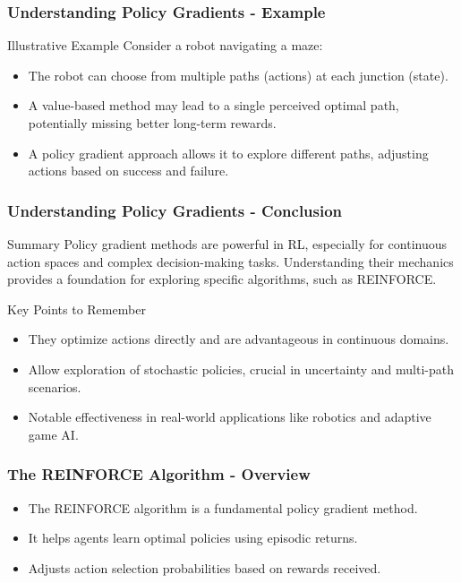 \documentclass{beamer}
\begin{document}
\begin{frame}[fragile]
    \frametitle{Understanding Policy Gradients - Example}
    \begin{block}{Illustrative Example}
        Consider a robot navigating a maze:
        \begin{itemize}
            \item The robot can choose from multiple paths (actions) at each junction (state).
            \item A value-based method may lead to a single perceived optimal path, potentially missing better long-term rewards.
            \item A policy gradient approach allows it to explore different paths, adjusting actions based on success and failure.
        \end{itemize}
    \end{block}
\end{frame}

\begin{frame}[fragile]
    \frametitle{Understanding Policy Gradients - Conclusion}
    \begin{block}{Summary}
        Policy gradient methods are powerful in RL, especially for continuous action spaces and complex decision-making tasks. 
        Understanding their mechanics provides a foundation for exploring specific algorithms, such as REINFORCE.
    \end{block}
    \begin{block}{Key Points to Remember}
        \begin{itemize}
            \item They optimize actions directly and are advantageous in continuous domains.
            \item Allow exploration of stochastic policies, crucial in uncertainty and multi-path scenarios.
            \item Notable effectiveness in real-world applications like robotics and adaptive game AI.
        \end{itemize}
    \end{block}
\end{frame}

\begin{frame}[fragile]
    \frametitle{The REINFORCE Algorithm - Overview}
    \begin{itemize}
        \item The REINFORCE algorithm is a fundamental policy gradient method.
        \item It helps agents learn optimal policies using episodic returns.
        \item Adjusts action selection probabilities based on rewards received.
    \end{itemize}
\end{frame}
\end{document}
